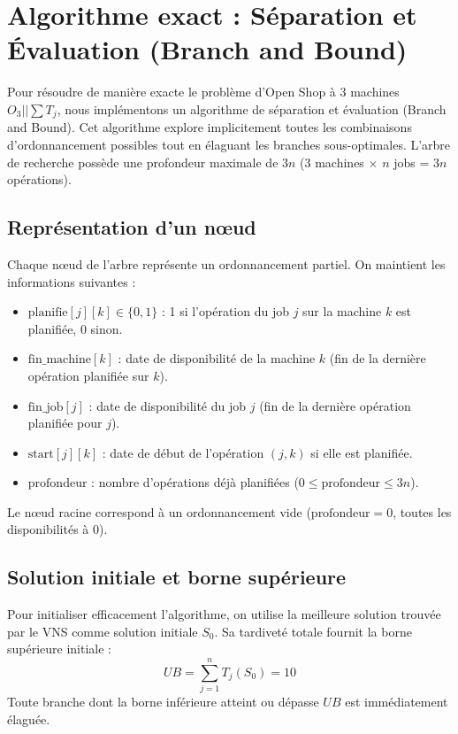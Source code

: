 \section{Algorithme exact : Séparation et Évaluation (Branch and Bound)}

Pour résoudre de manière exacte le problème d'Open Shop à 3 machines $O_3||\sum T_j$, nous implémentons un algorithme de séparation et évaluation (Branch and Bound). Cet algorithme explore implicitement toutes les combinaisons d'ordonnancement possibles tout en élaguant les branches sous-optimales. L'arbre de recherche possède une profondeur maximale de $3n$ (3 machines $\times$ $n$ jobs = $3n$ opérations).

\subsection{Représentation d'un n\oe ud}

Chaque n\oe ud de l'arbre représente un ordonnancement partiel. On maintient les informations suivantes :
\begin{itemize}
    \item $\text{planifie}[j][k] \in \{0, 1\}$ : 1 si l'opération du job $j$ sur la machine $k$ est planifiée, 0 sinon.
    \item $\text{fin\_machine}[k]$ : date de disponibilité de la machine $k$ (fin de la dernière opération planifiée sur $k$).
    \item $\text{fin\_job}[j]$ : date de disponibilité du job $j$ (fin de la dernière opération planifiée pour $j$).
    \item $\text{start}[j][k]$ : date de début de l'opération $(j, k)$ si elle est planifiée.
    \item $\text{profondeur}$ : nombre d'opérations déjà planifiées ($0 \leq \text{profondeur} \leq 3n$).
\end{itemize}

Le n\oe ud racine correspond à un ordonnancement vide ($\text{profondeur} = 0$, toutes les disponibilités à 0).

\subsection{Solution initiale et borne supérieure}

Pour initialiser efficacement l'algorithme, on utilise la meilleure solution trouvée par le VNS comme solution initiale $S_0$. Sa tardiveté totale fournit la borne supérieure initiale :
\begin{equation}
    UB = \sum_{j=1}^{n} T_j(S_0) = 10
\end{equation}
Toute branche dont la borne inférieure atteint ou dépasse $UB$ est immédiatement élaguée.

